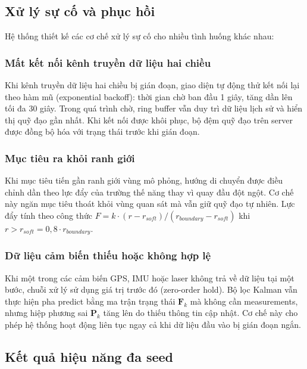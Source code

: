 \subsection{Xử lý sự cố và phục hồi}

\hspace{0.5cm} Hệ thống thiết kế các cơ chế xử lý sự cố cho nhiều tình huống khác nhau:

\subsubsection{Mất kết nối kênh truyền dữ liệu hai chiều}

\hspace{0.5cm} Khi kênh truyền dữ liệu hai chiều bị gián đoạn, giao diện tự động thử kết nối lại theo hàm mũ (exponential backoff): thời gian chờ ban đầu 1 giây, tăng dần lên tối đa 30 giây. Trong quá trình chờ, ring buffer vẫn duy trì dữ liệu lịch sử và hiển thị quỹ đạo gần nhất. Khi kết nối được khôi phục, bộ đệm quỹ đạo trên server được đồng bộ hóa với trạng thái trước khi gián đoạn.

\subsubsection{Mục tiêu ra khỏi ranh giới}

\hspace{0.5cm} Khi mục tiêu tiến gần ranh giới vùng mô phỏng, hướng di chuyển được điều chỉnh dần theo lực đẩy của trường thế năng thay vì quay đầu đột ngột. Cơ chế này ngăn mục tiêu thoát khỏi vùng quan sát mà vẫn giữ quỹ đạo tự nhiên. Lực đẩy tính theo công thức $F = k \cdot (r - r_{soft}) / (r_{boundary} - r_{soft})$ khi $r > r_{soft} = 0,8 \cdot r_{boundary}$.

\subsubsection{Dữ liệu cảm biến thiếu hoặc không hợp lệ}

\hspace{0.5cm} Khi một trong các cảm biến GPS, IMU hoặc laser không trả về dữ liệu tại một bước, chuỗi xử lý sử dụng giá trị trước đó (zero-order hold). Bộ lọc Kalman vẫn thực hiện pha predict bằng ma trận trạng thái $\mathbf{F}_k$ mà không cần measurements, nhưng hiệp phương sai $\mathbf{P}_k$ tăng lên do thiếu thông tin cập nhật. Cơ chế này cho phép hệ thống hoạt động liên tục ngay cả khi dữ liệu đầu vào bị gián đoạn ngắn.

\subsection{Kết quả hiệu năng đa seed}


